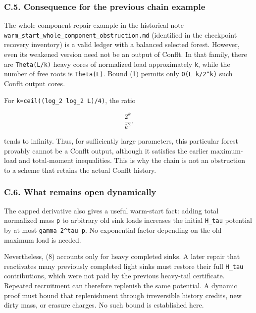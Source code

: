\hypertarget{af-385fd70686-c.5.-consequence-for-the-previous-chain-example}{%
\subsubsection{C.5. Consequence for the previous chain example}\label{af-385fd70686-c.5.-consequence-for-the-previous-chain-example}}

The whole-component repair example in the historical note \texttt{warm\_start\_whole\_component\_obstruction.md} (identified in the checkpoint recovery inventory) is a valid ledger with a balanced selected forest. However, even its weakened version need not be an output of Conflt. In that family, there are \texttt{Theta(L/k)} heavy cores of normalized load approximately \texttt{k}, while the number of free roots is \texttt{Theta(L)}. Bound (1) permits only \texttt{O(L\ k/2\^{}k)} such Conflt output cores.

For \texttt{k=ceil((log\_2\ log\_2\ L)/4)}, the ratio

\[
\frac{2^k}{k^2}.
\]

tends to infinity. Thus, for sufficiently large parameters, this particular forest provably cannot be a Conflt output, although it satisfies the earlier maximum-load and total-moment inequalities. This is why the chain is not an obstruction to a scheme that retains the actual Conflt history.

\hypertarget{af-385fd70686-c.6.-what-remains-open-dynamically}{%
\subsubsection{C.6. What remains open dynamically}\label{af-385fd70686-c.6.-what-remains-open-dynamically}}

The capped derivative also gives a useful warm-start fact: adding total normalized mass \texttt{p} to arbitrary old sink loads increases the initial \texttt{H\_tau} potential by at most \texttt{gamma\ 2\^{}tau\ p}. No exponential factor depending on the old maximum load is needed.

Nevertheless, (8) accounts only for heavy completed sinks. A later repair that reactivates many previously completed light sinks must restore their full \texttt{H\_tau} contributions, which were not paid by the previous heavy-tail certificate. Repeated recruitment can therefore replenish the same potential. A dynamic proof must bound that replenishment through irreversible history credits, new dirty mass, or erasure charges. No such bound is established here.

